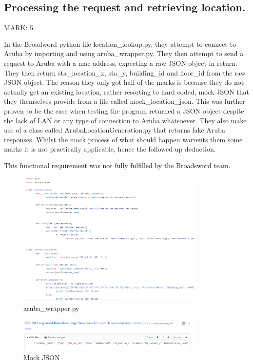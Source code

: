\documentclass{article}
\begin{document}
\subsection{Processing the request and retrieving location.}
\begin{flushleft}MARK: 5\end{flushleft}
In the Broadword python file location\_lookup.py, they attempt to connect to Aruba by importing and using aruba\_wrapper.py. 
They then attempt to send a request to Aruba with a mac address, expecting a raw JSON object in return. They then return 
sta\_location\_x, sta\location\_y, building\_id and floor\_id from the raw JSON object. The reason they only got half of the marks
is because they do not actually get an existing location, rather resorting to hard coded, mock JSON that they themselves provide 
from a file called mock_location_json. This was further proven to be the case when testing the program returned a JSON object despite the lack of LAN or any type of connection to Aruba whatsoever. They also make use of a class called ArubaLocationGeneration.py that returns fake Aruba responses. Whilst the mock process of what should happen warrents them some marks it is not practically applicable, hence the followed up deduction.  
\begin{flushleft}This functional requirement was not fully fulfilled by the Broadsword team.\end{flushleft}
\begin{figure}[ht]
  \includegraphics[width=350px]{Images/getLoc.PNG}
  \caption{aruba\_wrapper.py}
  \label{fig:aruba\_wrapper.py}
\end{figure}
\begin{figure}[ht]
  \includegraphics[width=350px]{Images/json.PNG}
  \caption{Mock JSON}
  \label{Mock JSON}
\end{figure}
\end{document}
